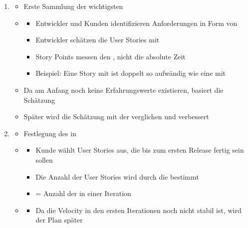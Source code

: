 \begin{enumerate}
    \item {}
    \begin{itemize}
        \item {} Erste Sammlung der wichtigsten 
        \item {}
        \begin{itemize}
            \item Entwickler und Kunden identifizieren  Anforderungen in Form von 
            \item Entwickler schätzen die User Stories mit 
            \item Story Points messen den , nicht die absolute Zeit
            \item Beispiel: Eine Story mit  ist doppelt so aufwändig wie eine mit 
        \end{itemize}
        \item {} Da am Anfang noch keine Erfahrungswerte existieren, basiert die Schätzung 
        \item Später wird die Schätzung mit der  verglichen und verbessert
    \end{itemize}
    \item {}
    \begin{itemize}
        \item {} Festlegung des  in 
        \item {}
        \begin{itemize}
            \item Kunde wählt User Stories aus, die bis zum ersten Release fertig sein sollen
            \item Die Anzahl der User Stories wird durch die  bestimmt
            \item {} = Anzahl der in einer Iteration 
        \end{itemize}
        \item {}
        \begin{itemize}
            \item Da die Velocity in den ersten Iterationen noch nicht stabil ist, wird der Plan später 

\end{itemize}
\end{itemize}
\end{enumerate}
